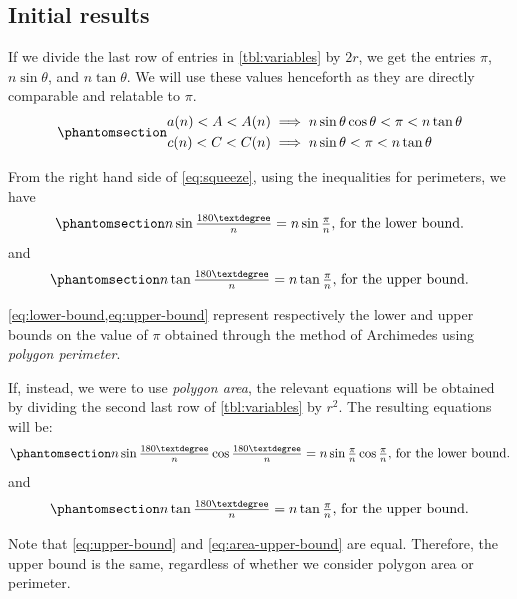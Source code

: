 \documentclass[
  a4paper,
]{article}
\begin{document}
\subsection{Initial results}\label{initial-results}

If we divide the last row of entries in \cref{tbl:variables} by \(2r\),
we get the entries \(\pi\), \(n\sin\theta\), and \(n\tan\theta\). We
will use these values henceforth as they are directly comparable and
relatable to \(\pi\). \begin{equation}\phantomsection\label{eq:squeeze}{
\begin{aligned}
a(n) < A < A(n) &\implies n\sin\theta\cos\theta < \pi < n\tan\theta\\
c(n) < C < C(n) &\implies n\sin\theta < \pi < n\tan\theta\\
\end{aligned}
}\end{equation}

From the right hand side of \cref{eq:squeeze}, using the inequalities
for perimeters, we have
\begin{equation}\phantomsection\label{eq:lower-bound}{
n\sin\tfrac{180°}{n} = n\sin\tfrac{\pi}{n}, \thinspace \mbox{for the lower bound}.
}\end{equation} and
\begin{equation}\phantomsection\label{eq:upper-bound}{
n\tan\tfrac{180°}{n} = n\tan\tfrac{\pi}{n}, \thinspace \mbox{for the upper bound}.
}\end{equation}

\cref{eq:lower-bound,eq:upper-bound} represent respectively the lower
and upper bounds on the value of \(\pi\) obtained through the method of
Archimedes using \emph{polygon perimeter}.

If, instead, we were to use \emph{polygon area}, the relevant equations
will be obtained by dividing the second last row of \cref{tbl:variables}
by \(r^2\). The resulting equations will be:
\begin{equation}\phantomsection\label{eq:area-lower-bound}{
n\sin\tfrac{180°}{n}\cos\tfrac{180°}{n} = n\sin\tfrac{\pi}{n}\cos\tfrac{\pi}{n}, \thinspace \mbox{for the lower bound}.
}\end{equation} and
\begin{equation}\phantomsection\label{eq:area-upper-bound}{
n\tan\tfrac{180°}{n} = n\tan\tfrac{\pi}{n}, \thinspace \mbox{for the upper bound}.
}\end{equation}

Note that \cref{eq:upper-bound} and \cref{eq:area-upper-bound} are
equal. Therefore, the upper bound is the same, regardless of whether we
consider polygon area or perimeter.
\end{document}

